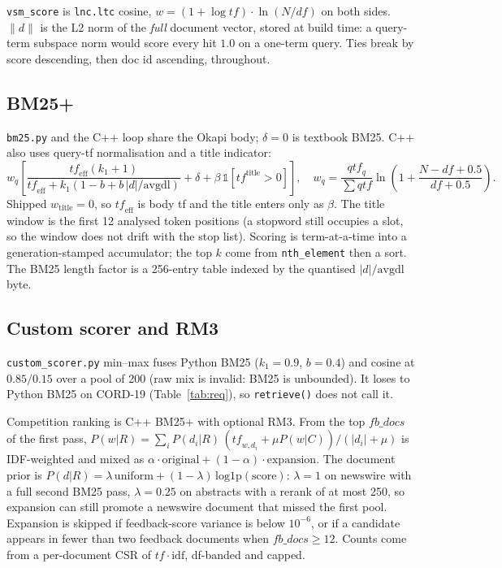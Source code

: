 \documentclass[10pt,a4paper]{article}
\begin{document}
\texttt{vsm\_score} is \texttt{lnc.ltc} cosine,
$w=(1+\log \mathit{tf})\cdot\ln(N/\mathit{df})$ on both sides. $\|d\|$ is the L2
norm of the \emph{full} document vector, stored at build time: a query-term subspace
norm would score every hit $1.0$ on a one-term query. Ties break by score descending,
then doc id ascending, throughout.

\subsection{BM25+}
\texttt{bm25.py} and the C++ loop share the Okapi body; $\delta{=}0$ is textbook BM25.
C++ also uses query-tf normalisation and a title indicator:
\[
w_q\left[\frac{\mathit{tf}_{\mathrm{eff}}(k_1+1)}
{\mathit{tf}_{\mathrm{eff}}+k_1(1-b+b\,|d|/\mathrm{avgdl})}
+\delta+\beta\,\mathbb{1}[\mathit{tf}^{\mathrm{title}}>0]\right],
\quad
w_q=\frac{\mathit{qtf}_q}{\sum \mathit{qtf}}\ln\!\left(1+\frac{N-\mathit{df}+0.5}{\mathit{df}+0.5}\right).
\]
Shipped $w_{\mathrm{title}}{=}0$, so $\mathit{tf}_{\mathrm{eff}}$ is body tf and the
title enters only as $\beta$. The title window is the first 12 analysed token
positions (a stopword still occupies a slot, so the window does not drift with the
stop list). Scoring is term-at-a-time into a generation-stamped accumulator; the top
$k$ come from \texttt{nth\_element} then a sort. The BM25 length factor is a 256-entry
table indexed by the quantised $|d|/\mathrm{avgdl}$ byte.

\subsection{Custom scorer and RM3}
\texttt{custom\_scorer.py} min--max fuses Python BM25 ($k_1{=}0.9$, $b{=}0.4$) and
cosine at $0.85/0.15$ over a pool of 200 (raw mix is invalid: BM25 is unbounded). It
loses to Python BM25 on CORD-19 (Table~\ref{tab:req}), so \texttt{retrieve()} does not
call it.

Competition ranking is C++ BM25+ with optional RM3. From the top
$\mathit{fb\_docs}$ of the first pass,
$P(w|R)=\sum_i P(d_i|R)\,(\mathit{tf}_{w,d_i}+\mu P(w|C))/(|d_i|+\mu)$ is IDF-weighted
and mixed as $\alpha\cdot\mathrm{original}+(1-\alpha)\cdot\mathrm{expansion}$. The
document prior is $P(d|R)=\lambda\,\mathrm{uniform}+(1-\lambda)\,\mathrm{log1p}(\mathrm{score})$:
$\lambda{=}1$ on newswire with a full second BM25 pass, $\lambda{=}0.25$ on abstracts
with a rerank of at most 250, so expansion can still promote a newswire document that
missed the first pool. Expansion is skipped if feedback-score variance is below
$10^{-6}$, or if a candidate appears in fewer than two feedback documents when
$\mathit{fb\_docs}\ge 12$. Counts come from a per-document CSR of
$\mathit{tf}\cdot\mathrm{idf}$, df-banded and capped.
\end{document}
